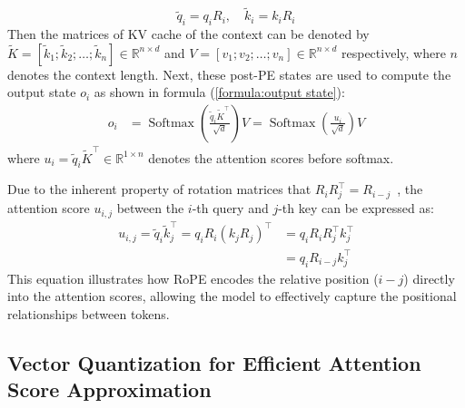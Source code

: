 \begin{equation}
    \tilde q_i = q_i R_i, \quad \tilde k_i = k_i R_i
\end{equation}
Then the matrices
of KV cache
of the context can be denoted by \({\tilde K} = [{\tilde k}_1; {\tilde k}_2; \dots; {\tilde k}_n] \in \mathbb R^{n \times d}\) and \(V = [ v_1;  v_2; \dots;  v_n] \in \mathbb R^{n \times d}\) respectively, where \(n\) denotes the context length.
Next, these post-PE states are used to compute the output state \(o_i\) as shown in formula (\ref{formula:output state}):
\begin{equation}\label{formula:output state}
    \begin{aligned}
        o_i & = \operatorname{Softmax}\left( \frac{\tilde q_i {\tilde K}^\top}{\sqrt d} \right) V 
        = \operatorname{Softmax} \left( \frac{u_i}{\sqrt d} \right) V
    \end{aligned}
\end{equation}
where \(u_i = \tilde q_i {\tilde K}^\top \in \mathbb R^{1 \times n}\) denotes the attention scores before softmax. 

Due to the inherent property of rotation matrices that \(R_i R_j^\top = R_{i-j}\)~\citep{rope}, the attention score \(u_{i,j}\) between the \(i\)-th query and \(j\)-th key can be expressed as:
\begin{equation}
    \label{eq:rope}
    \begin{aligned}
        u_{i,j} = \tilde q_i {\tilde k}^\top_j = q_i R_i (k_j R_j)^\top 
        &= q_i R_i R_j^\top k_j^\top \\
        &= q_i R_{i-j} k_j^\top
    \end{aligned}
\end{equation}
This equation illustrates how RoPE encodes the relative position (\(i-j\)) directly into the attention scores, 
allowing the model to effectively capture
the positional relationships between tokens.

\subsection{Vector Quantization for Efficient Attention Score Approximation}

